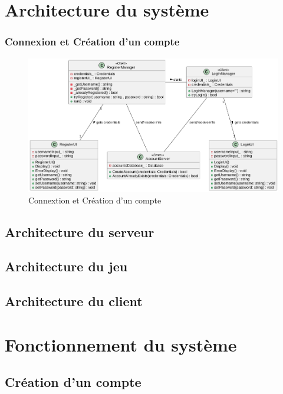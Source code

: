 \documentclass{article}
\begin{document}
\newpage

\section{Architecture du système}
\subsubsection{Connexion et Création d'un compte}

\begin{figure}[!h]
    \centering
    \includegraphics[width=1\textwidth]{uml/class/connexion/Connexion.png}
    \caption{Connextion et Création d'un compte}
    \label{fig:Royal-Competition}
\end{figure}

\subsection{Architecture du serveur}

\subsection{Architecture du jeu}

\subsection{Architecture du client}

\section{Fonctionnement du système}

\subsection{Création d'un compte}
\end{document}
